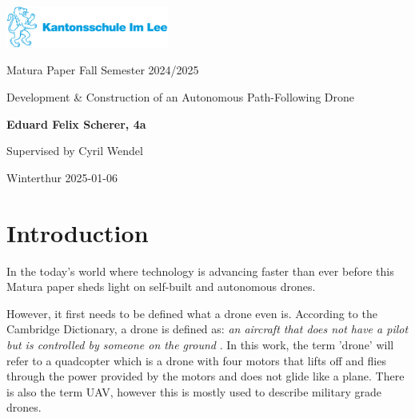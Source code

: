 \documentclass[svgnames]{article}
\begin{document}
\begin{titlepage}

	\begin{center}
	
	\includegraphics[width=0.4\textwidth]{pictures/ksimleelogo}
	\vspace*{17em}
	
	\small
	Matura Paper Fall Semester 2024/2025
	
	\LARGE
	Development \& Construction of an Autonomous Path-Following Drone
	
	\vspace*{0.5em}
	\normalsize
	\textbf{Eduard Felix Scherer, 4a}
	
	Supervised by Cyril Wendel
	\vspace*{\fill}
	
	\normalsize
	Winterthur 2025-01-06
	\end{center}
\end{titlepage}

\newpage
\tableofcontents
\newpage
	\section{Introduction}
	
	In the today's world where technology is advancing faster than ever before this Matura paper sheds light on self-built and autonomous drones.
	
	However, it first needs to be defined what a drone even is. According to the Cambridge Dictionary, a drone is defined as: \textit{an aircraft that does not have a pilot but is controlled by someone on the ground} \cite{cambridgedrone}. In this work, the term 'drone' will refer to a quadcopter which is a drone with four motors that lifts off and flies through the power provided by the motors and does not glide like a plane. There is also the term \gls{UAV}, however this is mostly used to describe military grade drones.
\end{document}
